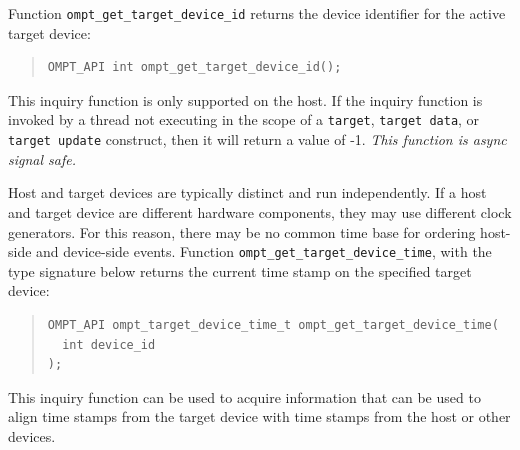 \documentclass{article}
\begin{document}
Function \verb|ompt_get_target_device_id| returns the device identifier for the active target device:
\begin{quote}
\begin{verbatim}
OMPT_API int ompt_get_target_device_id();
\end{verbatim}
\end{quote}
This inquiry function is only supported on the host. If the inquiry function is invoked by a thread not executing in the scope of a {\tt target}, {\tt target data}, or {\tt target update} construct, then it will return a value of -1. {\it This function is async signal safe.}

Host and target devices are typically distinct and run independently. If a
host and target device are different hardware components, they may 
use different clock generators. For this reason,  there may be no common time base for ordering host-side and device-side events.
Function \verb|ompt_get_target_device_time|, with the type signature below returns the current time stamp on the specified target device:
\begin{quote}
\begin{verbatim}
OMPT_API ompt_target_device_time_t ompt_get_target_device_time(
  int device_id
);
\end{verbatim}
\end{quote}
This inquiry function can be used
to acquire information that can be used to align time stamps from the target device with time
stamps from the host or other devices.

\end{document}
